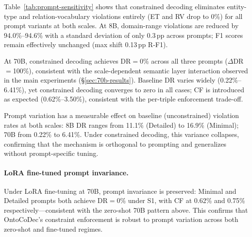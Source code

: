 Table~\ref{tab:prompt-sensitivity} shows that constrained decoding eliminates entity-type and relation-vocabulary violations entirely (ET and RV drop to 0\%) for all prompt variants at both scales. At 8B, domain-range violations are reduced by 94.0\%--94.6\% with a standard deviation of only 0.3\,pp across prompts; F1 scores remain effectively unchanged (max shift 0.13\,pp R-F1).

At 70B, constrained decoding achieves DR${=}$0\% across all three prompts ($\Delta$DR${=}$100\%), consistent with the scale-dependent semantic layer interaction observed in the main experiments (\S\ref{sec:70b-results}). Baseline DR varies widely (0.22\%--6.41\%), yet constrained decoding converges to zero in all cases; CF is introduced as expected (0.62\%--3.50\%), consistent with the per-triple enforcement trade-off.

Prompt variation has a measurable effect on baseline (unconstrained) violation rates at both scales: 8B DR ranges from 11.1\% (Detailed) to 16.9\% (Minimal); 70B from 0.22\% to 6.41\%. Under constrained decoding, this variance collapses, confirming that the mechanism is orthogonal to prompting and generalizes without prompt-specific tuning.

\paragraph{LoRA fine-tuned prompt invariance.}
Under LoRA fine-tuning at 70B, prompt invariance is preserved: Minimal and Detailed prompts both achieve DR${=}$0\% under S1, with CF at 0.62\% and 0.75\% respectively---consistent with the zero-shot 70B pattern above.
This confirms that OntoCoDec's constraint enforcement is robust to prompt variation across both zero-shot and fine-tuned regimes.

